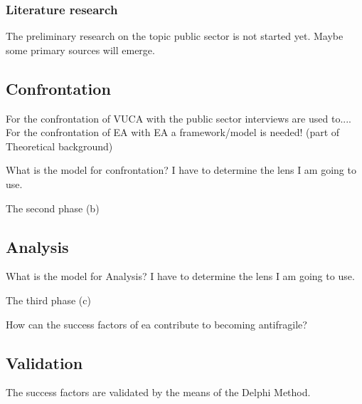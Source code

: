 \subsubsection{Literature research}








\begin{remark}
	The preliminary research on the topic public sector is not started yet. Maybe some primary sources will emerge.
\end{remark}

\subsection{Confrontation}
\label{sub:confrontationphase}

For the confrontation of VUCA with the public sector interviews are used to....\\
For the confrontation of EA with EA a framework/model is needed! (part of Theoretical background)

\begin{remark}
	What is the model for confrontation?
	I have to determine the lens I am going to use.
\end{remark}

The second phase (b) 

\subsection{Analysis}
\label{sub:analysisphase}

\begin{remark}
	What is the model for Analysis?
	I have to determine the lens I am going to use.
\end{remark}

The third phase (c)

How can the success factors of \acrlong{ea} contribute to becoming antifragile?

\subsection{Validation}
\label{sub:validatinphase}
The success factors are validated by the means of the Delphi Method.


